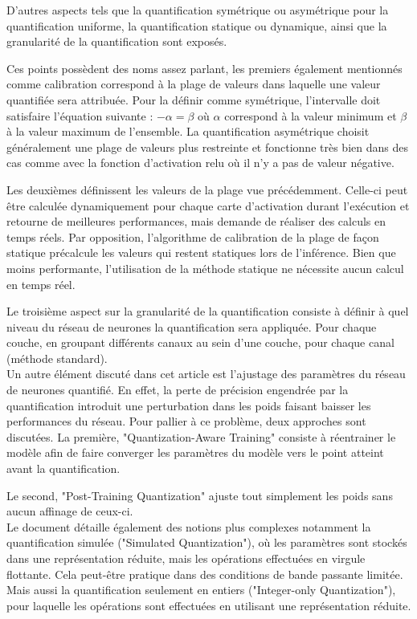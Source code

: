 D'autres aspects tels que la quantification symétrique ou asymétrique pour la quantification uniforme, la quantification statique ou dynamique, ainsi que la granularité de la quantification sont exposés.

Ces points possèdent des noms assez parlant, les premiers également mentionnés comme calibration correspond à la plage de valeurs dans laquelle une valeur quantifiée sera attribuée. Pour la définir comme symétrique, l'intervalle doit satisfaire l'équation suivante : $-\alpha=\beta$ où $\alpha$ correspond à la valeur minimum et $\beta$ à la valeur maximum de l'ensemble. La quantification asymétrique choisit généralement une plage de valeurs plus restreinte et fonctionne très bien dans des cas comme avec la fonction d'activation \acrshort{relu} où il n'y a pas de valeur négative.

Les deuxièmes définissent les valeurs de la plage vue précédemment. Celle-ci peut être calculée dynamiquement pour chaque carte d'activation durant l'exécution et retourne de meilleures performances, mais demande de réaliser des calculs en temps réels. Par opposition, l'algorithme de calibration de la plage de façon statique précalcule les valeurs qui restent statiques lors de l'inférence. Bien que moins performante, l'utilisation de la méthode statique ne nécessite aucun calcul en temps réel.

Le troisième aspect sur la granularité de la quantification consiste à définir à quel niveau du réseau de neurones la quantification sera appliquée. Pour chaque couche, en groupant différents canaux au sein d'une couche, pour chaque canal (méthode standard).\\

Un autre élément discuté dans cet article est l'ajustage des paramètres du réseau de neurones quantifié. En effet, la perte de précision engendrée par la quantification introduit une perturbation dans les poids faisant baisser les performances du réseau. Pour pallier à ce problème, deux approches sont discutées. La première, "Quantization-Aware Training" consiste à réentrainer le modèle afin de faire converger les paramètres du modèle vers le point atteint avant la quantification.

Le second, "Post-Training Quantization" ajuste tout simplement les poids sans aucun affinage de ceux-ci.\\

Le document détaille également des notions plus complexes notamment la quantification simulée ("Simulated Quantization"), où les paramètres sont stockés dans une représentation réduite, mais les opérations effectuées en virgule flottante. Cela peut-être pratique dans des conditions de bande passante limitée. Mais aussi la quantification seulement en entiers ("Integer-only Quantization"), pour laquelle les opérations sont effectuées en utilisant une représentation réduite.\\

